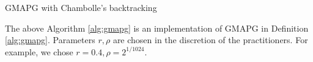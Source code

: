 \documentclass[12pt]{report}
\begin{document}
\begin{algorithm}[H]
\begin{algorithmic}[1]
{                        }
                        \ENDIF
                    \ENDFOR
                \caption{GMAPG with Chambolle's backtracking}\label{alg:gmapg}
                \end{algorithmic}
            \end{algorithm}
            The above Algorithm \ref{alg:gmapg} is an implementation of GMAPG in Definition \ref{alg:gmapg}. 
            Parameters $r, \rho$ are chosen in the discretion of the practitioners. 
            For example, we chose $r= 0.4, \rho = 2^{1/1024}$. 
    
\end{document}
